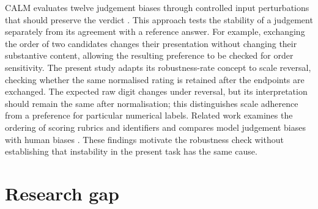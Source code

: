 CALM evaluates twelve judgement biases through controlled input perturbations
that should preserve the verdict \cite{ye2025justice}.
This approach tests the stability of a judgement separately from its
agreement with a reference answer. For example, exchanging the order of two
candidates changes their presentation without changing their substantive
content, allowing the resulting preference to be checked for order sensitivity.
The present study adapts its robustness-rate concept to scale reversal,
checking whether the same normalised rating is retained after the endpoints
are exchanged. The expected raw digit changes under reversal, but its
interpretation should remain the same after normalisation; this distinguishes
scale adherence from a preference for particular numerical labels.
Related work examines the ordering of scoring rubrics and
identifiers \cite{li2026scoring} and compares model judgement biases with
human biases \cite{chen2024humans}. These findings motivate the robustness
check without establishing that instability in the present task has the
same cause.


\section{Research gap}\label{sec:bg-gap}

